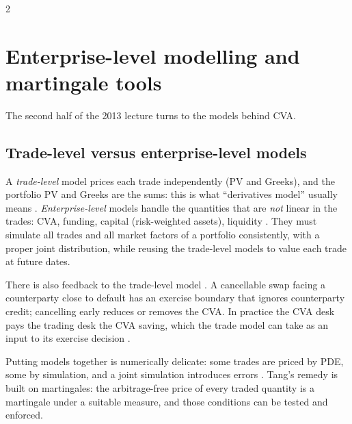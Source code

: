 \begin{paracol}{2}
\section{Enterprise-level modelling and martingale tools}\label{ch08:sec-martingale}
The second half of the 2013 lecture turns to the models behind CVA.

\subsection{Trade-level versus enterprise-level models}
A \emph{trade-level} model prices each trade independently (PV and Greeks), and the portfolio PV and Greeks are the
sums: this is what ``derivatives model'' usually means . \emph{Enterprise-level} models handle the
quantities that are \emph{not} linear in the trades: CVA, funding, capital (risk-weighted assets), liquidity
. They must simulate all trades and all market factors of a portfolio consistently, with a proper
joint distribution, while reusing the trade-level models to value each trade at future dates.

There is also feedback to the trade-level model . A cancellable swap facing a counterparty close to
default has an exercise boundary that ignores counterparty credit; cancelling early reduces or removes the CVA. In
practice the CVA desk pays the trading desk the CVA saving, which the trade model can take as an input to its
exercise decision .

Putting models together is numerically delicate: some trades are priced by PDE, some by simulation, and a joint
simulation introduces errors . Tang's remedy is built on martingales: the arbitrage-free price of
every traded quantity is a martingale under a suitable measure, and those conditions can be tested and enforced.


\end{paracol}
